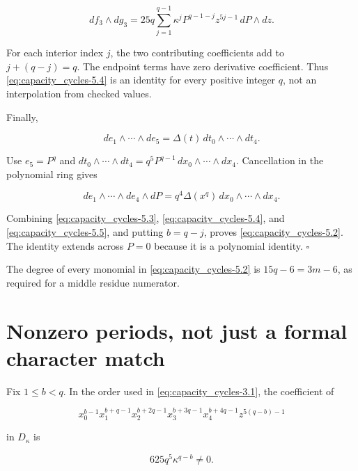 \begin{equation}\label{eq:capacity_cycles-5.4}
df_3\wedge dg_3=
25q\sum_{j=1}^{q-1}\kappa^jP^{q-1-j}z^{5j-1}\,dP\wedge dz.\end{equation}

For each interior index \(j\), the two contributing coefficients add to
\(j+(q-j)=q\). The endpoint terms have zero derivative coefficient. Thus
\eqref{eq:capacity_cycles-5.4} is an identity for every positive integer \(q\), not an
interpolation from checked values.

Finally,

\[
de_1\wedge\cdots\wedge de_5
=\Delta(t)\,dt_0\wedge\cdots\wedge dt_4.
\]

Use \(e_5=P^q\) and
\(dt_0\wedge\cdots\wedge dt_4=q^5P^{q-1}\,dx_0\wedge\cdots\wedge dx_4\).
Cancellation in the polynomial ring gives

\begin{equation}\label{eq:capacity_cycles-5.5}
de_1\wedge\cdots\wedge de_4\wedge dP
=q^4\Delta(x^q)\,dx_0\wedge\cdots\wedge dx_4.\end{equation}

Combining \eqref{eq:capacity_cycles-5.3}, \eqref{eq:capacity_cycles-5.4}, and \eqref{eq:capacity_cycles-5.5}, and putting \(b=q-j\), proves \eqref{eq:capacity_cycles-5.2}.
The identity extends across \(P=0\) because it is a polynomial identity.
\(\square\)

The degree of every monomial in \eqref{eq:capacity_cycles-5.2} is \(15q-6=3m-6\), as required for
a middle residue numerator.

\hypertarget{capacity_cycles-nonzero-periods-not-just-a-formal-character-match}{%
\section{Nonzero periods, not just a formal character
match}\label{capacity_cycles-nonzero-periods-not-just-a-formal-character-match}}

Fix \(1\le b<q\). In the order used in \eqref{eq:capacity_cycles-3.1}, the coefficient of

\begin{equation}\label{eq:capacity_cycles-6.1}
x_0^{b-1}x_1^{b+q-1}x_2^{b+2q-1}x_3^{b+3q-1}x_4^{b+4q-1}
 z^{5(q-b)-1}\end{equation}

in \(D_\kappa\) is

\begin{equation}\label{eq:capacity_cycles-6.2}
625q^5\kappa^{q-b}\ne0.\end{equation}

